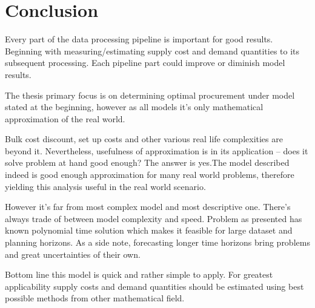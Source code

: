
\chapter{Conclusion}

Every part of the data processing pipeline is important for good results. Beginning with measuring/estimating supply cost and demand quantities to its subsequent processing. Each pipeline part could improve or diminish model results.

The thesis primary focus is on determining optimal procurement under model stated at the beginning, however as all models it's only mathematical approximation of the real world.

Bulk cost discount, set up costs and other various real life complexities are beyond it. Nevertheless, usefulness of approximation is in its application -- does it solve problem at hand good enough? The answer is yes.The model described indeed is good enough approximation for many real world problems, therefore yielding this analysis useful in the real world scenario.

However it's far from most complex model and most descriptive one. There's always trade of between model complexity and speed. Problem as presented has known polynomial time solution which makes it feasible for large dataset and planning horizons. As a side note, forecasting longer time horizons bring problems and great uncertainties of their own.

Bottom line this model is quick and rather simple to apply. For greatest applicability supply costs and demand quantities should be estimated using best possible methods from other mathematical field.

